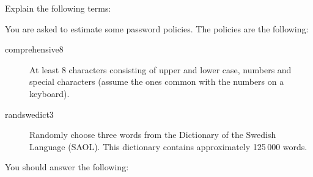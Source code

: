 \documentclass[svv,addpoints]{miunexam}
\begin{document}
\begin{questions}
  \question\label{q:passwd:auth:E}
  Explain the following terms:


  \question\label{q:passwd:infotheory:E:C:A}
  You are asked to estimate some password policies.
  The policies are the following:
  \begin{description}
    \item[comprehensive8]
      At least 8 characters consisting of upper and lower case, numbers and 
      special characters (assume the ones common with the numbers on 
      a keyboard).
    \item[randswedict3]
      Randomly choose three words from the Dictionary of the Swedish Language 
      (SAOL).
      This dictionary contains approximately 125\,000 words.
  \end{description}
  You should answer the following:
\end{questions}
\end{document}

